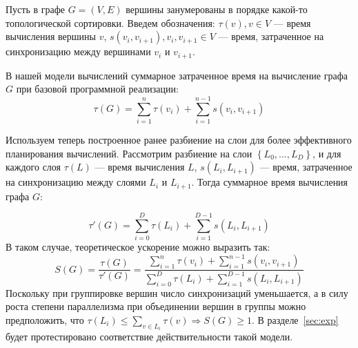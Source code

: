 Пусть в графе $G=(V,E)$ вершины занумерованы в порядке какой-то топологической
сортировки. Введем обозначения: $\tau(v), v\in V$ — время вычисления вершины
$v$, $s(v_{i}, v_{i+1}), v_{i},v_{i+1}\in V$ — время, затраченное на
синхронизацию между вершинами $v_{i}$ и $v_{i+1}$.

В нашей модели вычислений суммарное затраченное время на вычисление графа $G$
при базовой программной реализации:
$$
\tau(G) = \sum\limits_{i=1}^{n}{\tau(v_i)} + \sum\limits_{i=1}^{n-1}{s(v_{i},v_{i+1})}
$$ 

Используем теперь построенное ранее разбиение на слои для более эффективного
планирования вычислений. Рассмотрим разбиение на слои
$\left\{L_0,\ldots,L_D\right\}$, и для каждого слоя $\tau(L)$ — время вычисления
$L$, $s(L_i, L_{i+1})$ — время, затраченное на синхронизацию между слоями $L_i$
и $L_{i+1}$. Тогда суммарное время вычисления графа $G$:

$$
\tau'(G) = \sum\limits_{i=0}^{D}{\tau(L_i)} + \sum\limits_{i=1}^{D-1}{s(L_{i},L_{i+1})}
$$ 
В таком случае, теоретическое ускорение можно выразить так:
\begin{equation}\label{eqn:speedup}
    S(G) = \frac{\tau(G)}{\tau'(G)} = \frac{\sum\limits_{i=1}^{n}{\tau(v_i)} + \sum\limits_{i=1}^{n-1}{s(v_{i},v_{i+1})}}{\sum\limits_{i=0}^{D}{\tau(L_i)} + \sum\limits_{i=1}^{D-1}{s(L_{i},L_{i+1})}}
\end{equation}
Поскольку при группировке вершин число синхронизаций уменьшается, а в силу роста
степени параллелизма при объединении вершин в группы можно предположить, что
$\tau(L_i) \le \sum\limits_{v\in L_i}\tau(v) \Rightarrow S(G) \ge 1$. В
разделе~\ref{sec:exp} будет протестировано соответствие действительности такой
модели.
